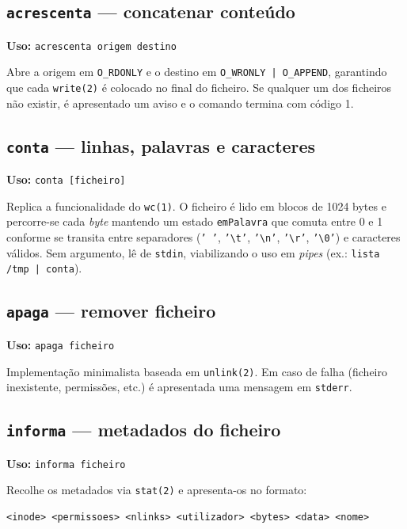 \documentclass[11pt,a4paper]{article}
\begin{document}
\subsection{\texttt{acrescenta} --- concatenar conteúdo}

\textbf{Uso:} \texttt{acrescenta origem destino}

Abre a origem em \texttt{O\_RDONLY} e o destino em \texttt{O\_WRONLY | O\_APPEND}, garantindo que cada \texttt{write(2)} é colocado no final do ficheiro. Se qualquer um dos ficheiros não existir, é apresentado um aviso e o comando termina com código 1.

\subsection{\texttt{conta} --- linhas, palavras e caracteres}

\textbf{Uso:} \texttt{conta [ficheiro]}

Replica a funcionalidade do \texttt{wc(1)}. O ficheiro é lido em blocos de 1024 bytes e percorre-se cada \textit{byte} mantendo um estado \texttt{emPalavra} que comuta entre 0 e 1 conforme se transita entre separadores (\texttt{' '}, \texttt{'\textbackslash t'}, \texttt{'\textbackslash n'}, \texttt{'\textbackslash r'}, \texttt{'\textbackslash 0'}) e caracteres válidos. Sem argumento, lê de \texttt{stdin}, viabilizando o uso em \textit{pipes} (ex.: \texttt{lista /tmp | conta}).

\subsection{\texttt{apaga} --- remover ficheiro}

\textbf{Uso:} \texttt{apaga ficheiro}

Implementação minimalista baseada em \texttt{unlink(2)}. Em caso de falha (ficheiro inexistente, permissões, etc.) é apresentada uma mensagem em \texttt{stderr}.

\subsection{\texttt{informa} --- metadados do ficheiro}

\textbf{Uso:} \texttt{informa ficheiro}

Recolhe os metadados via \texttt{stat(2)} e apresenta-os no formato:

\begin{lstlisting}[style=shellstyle]
<inode> <permissoes> <nlinks> <utilizador> <bytes> <data> <nome>
\end{lstlisting}
\end{document}
